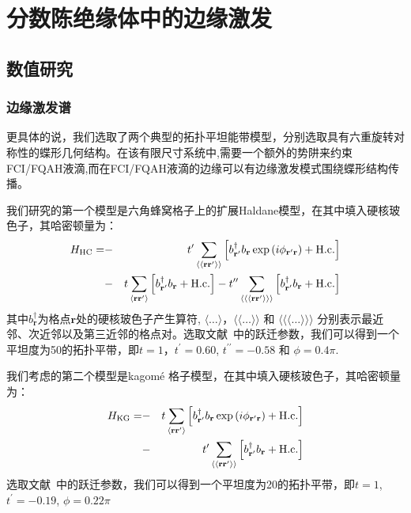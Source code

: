 \chapter{分数陈绝缘体中的边缘激发}
\label{sec:FCIedge}

\section{数值研究}
\subsection{边缘激发谱}
更具体的说，我们选取了两个典型的拓扑平坦能带模型，分别选取具有六重旋转对称性的蝶形几何结构。在该有限尺寸系统中,需要一个额外的势阱来约束FCI/FQAH液滴,而在FCI/FQAH液滴的边缘可以有边缘激发模式围绕蝶形结构传播。

我们研究的第一个模型是六角蜂窝格子上的扩展Haldane模型，在其中填入硬核玻色子，其哈密顿量为：
\begin{eqnarray}
H_{\rm HC}= &-&t^{\prime}\sum_{\langle\langle\mathbf{r}\mathbf{r}^{
\prime}\rangle\rangle}
\left[b^{\dagger}_{\mathbf{r}^{ \prime}}b_{\mathbf{r}}\exp\left(i\phi_{\mathbf{r}^{ \prime}\mathbf{r}}\right)+\textrm{H.c.}\right]\\
&-&t\sum_{\langle\mathbf{r}\mathbf{r}^{ \prime}\rangle}
\left[b^{\dagger}_{\mathbf{r}^{\prime}}b_{\mathbf{r}}+\textrm{H.c.}\right]
-t^{\prime\prime}\sum_{\langle\langle\langle\mathbf{r}\mathbf{r}^{
\prime}\rangle\rangle\rangle}
\left[b^{\dagger}_{\mathbf{r}^{\prime}}b_{\mathbf{r}}+\textrm{H.c.}\right]\nonumber
\label{eq:HC}
\end{eqnarray}
其中$b^{\dagger}_{\mathbf{r}}$为格点$\mathbf{r}$处的硬核玻色子产生算符,  $\langle\dots\rangle$，$\langle\langle\dots\rangle\rangle$ 和 $\langle\langle\langle\dots\rangle\rangle\rangle$ 分别表示最近邻、次近邻以及第三近邻的格点对。选取文献~\cite{YFWang1}中的跃迁参数，我们可以得到一个平坦度为50的拓扑平带，即$t=1$，$t^{\prime}=0.60$, $t^{\prime\prime}=-0.58$ 和 $\phi=0.4\pi$.

我们考虑的第二个模型是kagom\'{e} 格子模型，在其中填入硬核玻色子，其哈密顿量为：
\begin{eqnarray}
H_{\rm KG}= &-&t\sum_{\langle\mathbf{r}\mathbf{r}^{ \prime}\rangle}
\left[b^{\dagger}_{\mathbf{r}^{ \prime}}b_{\mathbf{r}}\exp\left(i\phi_{\mathbf{r}^{ \prime}\mathbf{r}}\right)+\textrm{H.c.}\right]\nonumber\\
&-&t^{\prime}\sum_{\langle\langle\mathbf{r}\mathbf{r}^{\prime}\rangle\rangle}
\left[b^{\dagger}_{\mathbf{r}^{\prime}}b_{\mathbf{r}}+\textrm{H.c.}\right]%
\label{eq:KG}
\end{eqnarray}
选取文献~\cite{RLiu}中的跃迁参数，我们可以得到一个平坦度为20的拓扑平带，即$t=1$, $t^{\prime}=-0.19$, $\phi=0.22\pi$

